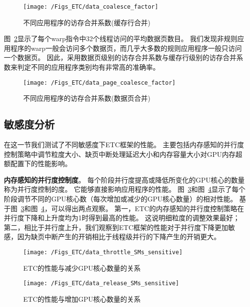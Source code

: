 \begin{figure}[htbp] %
  \centering
  \texttt{[image: /Figs\_ETC/data\_coalesce\_factor]}
  \caption{不同应用程序的访存合并系数(缓存行合并)}
  \label{fig:data_coalesce_factor}
\end{figure}


图~\ref{fig:data_page_coalesce_factor}显示了每个warp指令中32个线程访问的平均数据页数目。
我们发现非规则应用程序的warp一般会访问多个数据页，而几乎大多数的规则应用程序一般只访问一个数据页。
因此，采用数据页级别的访存合并系数与缓存行级别的访存合并系数来判定不同的应用程序类别均有非常高的准确率。

\begin{figure}[htbp] %
  \centering
  \texttt{[image: /Figs\_ETC/data\_page\_coalesce\_factor]}
  \caption{不同应用程序的访存合并系数(数据页合并)}
  \label{fig:data_page_coalesce_factor}
\end{figure}

\subsection{敏感度分析}
在这一节我们测试了不同敏感度下ETC框架的性能。
主要包括内存感知的并行度控制策略中调节粒度大小、缺页中断处理延迟大小和内存容量大小对GPU内存超额配置下的性能影响。

\textbf{内存感知的并行度控制度}。
每个阶段并行度提高或降低所变化的GPU核心的数量称为并行度控制的度。
它能够直接影响应用程序的性能。
图~\ref{fig:data_throttle_SMs_sensitive}和图~\ref{fig:data_release_SMs_sensitive}显示了每个阶段调节不同的GPU核心数（每次增加或减少的GPU核心数量）的相对性能。
基于图~\ref{fig:data_throttle_SMs_sensitive}和图~\ref{fig:data_release_SMs_sensitive}，可以得出两点观察。
第一，ETC的内存感知的并行度控制策略在并行度下降和上升度均为1时得到最高的性能。
这说明细粒度的调整效果最好；
第二，相比于并行度上升，我们观察到ETC框架的性能对于并行度下降更加敏感，因为缺页中断产生的开销相比于线程级并行的下降产生的开销更大。

\begin{figure}[htbp] %
  \centering
  \texttt{[image: /Figs\_ETC/data\_throttle\_SMs\_sensitive]}
  \caption{ETC的性能与减少GPU核心数量的关系}
  \label{fig:data_throttle_SMs_sensitive}
\end{figure}

\begin{figure}[htbp] %
  \centering
  \texttt{[image: /Figs\_ETC/data\_release\_SMs\_sensitive]}
  \caption{ETC的性能与增加GPU核心数量的关系}
  \label{fig:data_release_SMs_sensitive}
\end{figure}

